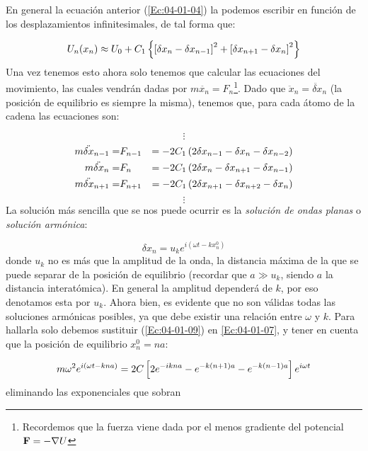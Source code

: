 En general la ecuación anterior (\ref{Ec:04-01-04}) la podemos escribir en función de los desplazamientos infinitesimales, de tal forma que:

\begin{equation}
	U_n (x_n)  \approx U_0 +  C_1  \left\lbrace \left[  \delta x_{n}-\delta x_{n-1} \right]^2 +\left[  \delta x_{n+1}-\delta x_n \right]^2 \right\rbrace
\end{equation}
Una vez tenemos esto ahora solo tenemos que calcular las ecuaciones del movimiento, las cuales vendrán dadas por $m\ddot{x_n} = F_n$\footnote{Recordemos que la fuerza viene dada por el menos gradiente del potencial $\mathbf{F}=-\nabla U$}. Dado que $\ddot{x}_n=\ddot{\delta x}_n$  (la posición de equilibrio es siempre la misma), tenemos que, para cada átomo de la cadena las ecuaciones son:

\begin{equation*}
 	\vdots 
\end{equation*} 	
\begin{eqnarray}
	m\ddot{\delta x}_{n-1}  = & F_{n-1} & =  - 2C_1 \left( 2\delta x_{n-1}-\delta x_{n}-\delta x_{n-2} \right) \\
	m\ddot{\delta x}_{n}  = & F_{n}   &=  -2C_1  \left( 2\delta x_{n}-\delta  x_{n+1}-\delta x_{n-1} \right) \label{Ec:04-01-07}  \\
	m\ddot{\delta x}_{n+1}  = & F_{n+1} &=  -2C_1  \left( 2\delta x_{n+1}-\delta x_{n+2}-\delta x_{n} \right)  
\end{eqnarray}	
\begin{equation*}
	\vdots
\end{equation*}
La solución más sencilla que se nos puede ocurrir es la  \textit{solución de ondas planas} o \textit{solución armónica}:

\begin{equation}
	\delta x_n = u_k e^{i(\omega t - kx_n^0)} \label{Ec:04-01-09}
\end{equation}
donde $u_k$ no es más que la amplitud de la onda, la distancia máxima de la que se puede separar de la posición de equilibrio (recordar que $a\gg u_k$, siendo $a$ la distancia interatómica). En general la amplitud dependerá de $k$, por eso denotamos esta por $u_k$. Ahora bien, es evidente que no son válidas todas las soluciones armónicas posibles, ya que debe existir una relación entre $\omega$ y $k$. Para hallarla solo debemos sustituir (\ref{Ec:04-01-09}) en \ref{Ec:04-01-07}, y tener en cuenta que la posición de equilibrio $x_n^0 = na$:

\begin{equation*}
	m\omega^2 e^{i(\omega t -kna)} = 2C \left[ 2e^{-ikna}-e^{-k(n+1)a}-e^{-k(n-1)a} \right] e^{i\omega t }
\end{equation*}
eliminando las exponenciales que sobran

